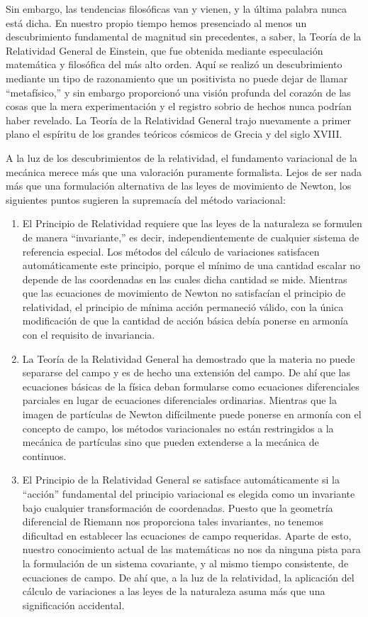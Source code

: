 Sin embargo, las tendencias filosóficas van y vienen, y la última palabra nunca está dicha. En nuestro propio tiempo hemos presenciado al menos un descubrimiento fundamental de magnitud sin precedentes, a saber, la Teoría de la Relatividad General de Einstein, que fue obtenida mediante especulación matemática y filosófica del más alto orden. Aquí se realizó un descubrimiento mediante un tipo de razonamiento que un positivista no puede dejar de llamar ``metafísico,'' y sin embargo proporcionó una visión profunda del corazón de las cosas que la mera experimentación y el registro sobrio de hechos nunca podrían haber revelado. La Teoría de la Relatividad General trajo nuevamente a primer plano el espíritu de los grandes teóricos cósmicos de Grecia y del siglo XVIII.

A la luz de los descubrimientos de la relatividad, el fundamento variacional de la mecánica merece más que una valoración puramente formalista. Lejos de ser nada más que una formulación alternativa de las leyes de movimiento de Newton, los siguientes puntos sugieren la supremacía del método variacional:

\begin{enumerate}
\item El Principio de Relatividad requiere que las leyes de la naturaleza se formulen de manera ``invariante,'' es decir, independientemente de cualquier sistema de referencia especial. Los métodos del cálculo de variaciones satisfacen automáticamente este principio, porque el mínimo de una cantidad escalar no depende de las coordenadas en las cuales dicha cantidad se mide. Mientras que las ecuaciones de movimiento de Newton no satisfacían el principio de relatividad, el principio de mínima acción permaneció válido, con la única modificación de que la cantidad de acción básica debía ponerse en armonía con el requisito de invariancia.

\item La Teoría de la Relatividad General ha demostrado que la materia no puede separarse del campo y es de hecho una extensión del campo. De ahí que las ecuaciones básicas de la física deban formularse como ecuaciones diferenciales parciales en lugar de ecuaciones diferenciales ordinarias. Mientras que la imagen de partículas de Newton difícilmente puede ponerse en armonía con el concepto de campo, los métodos variacionales no están restringidos a la mecánica de partículas sino que pueden extenderse a la mecánica de continuos.

\item El Principio de la Relatividad General se satisface automáticamente si la ``acción'' fundamental del principio variacional es elegida como un invariante bajo cualquier transformación de coordenadas. Puesto que la geometría diferencial de Riemann nos proporciona tales invariantes, no tenemos dificultad en establecer las ecuaciones de campo requeridas. Aparte de esto, nuestro conocimiento actual de las matemáticas no nos da ninguna pista para la formulación de un sistema covariante, y al mismo tiempo consistente, de ecuaciones de campo. De ahí que, a la luz de la relatividad, la aplicación del cálculo de variaciones a las leyes de la naturaleza asuma más que una significación accidental.
\end{enumerate}
